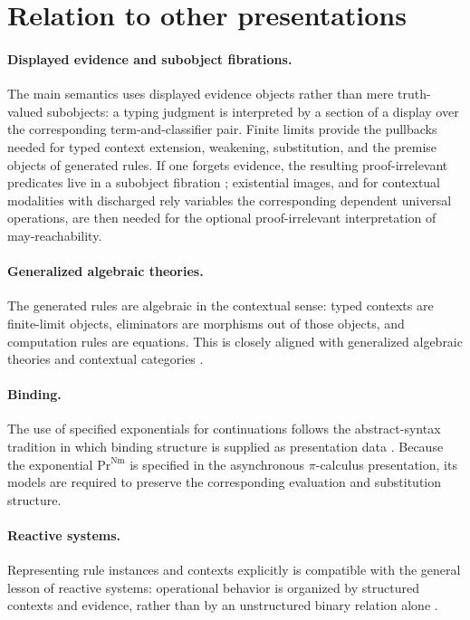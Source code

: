 \documentclass[11pt]{article}
\newcommand{\Proc}{\mathrm{Pr}}
\newcommand{\Nm}{\mathrm{Nm}}
\begin{document}
\section{Relation to other presentations}

\paragraph{Displayed evidence and subobject fibrations.}
The main semantics uses displayed evidence objects rather than mere truth-valued
subobjects: a typing judgment is interpreted by a section of a display over the
corresponding term-and-classifier pair.  Finite limits provide the pullbacks
needed for typed context extension, weakening, substitution, and the premise
objects of generated rules.  If one forgets evidence, the resulting
proof-irrelevant predicates live in a subobject fibration \cite{Jacobs1999,LambekScott1986}; existential images, and for contextual modalities with discharged rely variables the corresponding dependent universal operations, are then needed for the optional proof-irrelevant interpretation of may-reachability.

\paragraph{Generalized algebraic theories.}
The generated rules are algebraic in the contextual sense: typed contexts are finite-limit objects, eliminators are morphisms out of those objects, and computation rules are equations.  This is closely aligned with generalized algebraic theories and contextual categories \cite{Cartmell1986}.

\paragraph{Binding.}
The use of specified exponentials for continuations follows the abstract-syntax tradition in which binding structure is supplied as presentation data \cite{FiorePlotkinTuri1999}.  Because the exponential \(\Proc^\Nm\) is specified in the asynchronous \(\pi\)-calculus presentation, its models are required to preserve the corresponding evaluation and substitution structure.

\paragraph{Reactive systems.}
Representing rule instances and contexts explicitly is compatible with the general lesson of reactive systems: operational behavior is organized by structured contexts and evidence, rather than by an unstructured binary relation alone \cite{LeiferMilner2000}.
\end{document}
